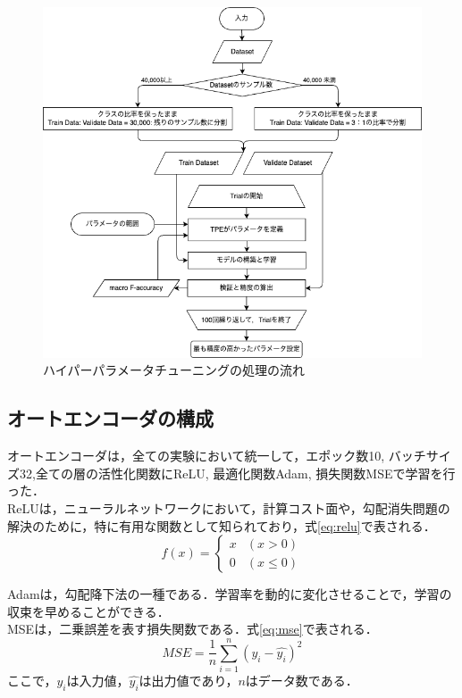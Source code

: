 \begin{figure}
    \centering
    \includegraphics[width=15cm]{figures/optuna.png}
        \caption{ハイパーパラメータチューニングの処理の流れ}
        \label{fig:hyperparameter-tuning}
\end{figure}



\subsection{オートエンコーダの構成}
オートエンコーダは，全ての実験において統一して，エポック数10, バッチサイズ32,全ての層の活性化関数にReLU, 最適化関数Adam, 損失関数MSEで学習を行った．\\
ReLUは，ニューラルネットワークにおいて，計算コスト面や，勾配消失問題の解決のために，特に有用な関数として知られており，式\ref{eq:relu}で表される．
\begin{equation}
    \label{eq:relu}
    f(x) = \begin{cases}
        x & (x > 0) \\
        0 & (x \leq 0)
    \end{cases}
\end{equation}

Adamは，勾配降下法の一種である．学習率を動的に変化させることで，学習の収束を早めることができる．\\
MSEは，二乗誤差を表す損失関数である．式\ref{eq:mse}で表される．
\begin{equation}
    \label{eq:mse}
    MSE = \frac{1}{n}\sum_{i=1}^{n}(y_i - \hat{y_i})^2
\end{equation}
ここで，$y_i$は入力値，$\hat{y_i}$は出力値であり，$n$はデータ数である．\\
